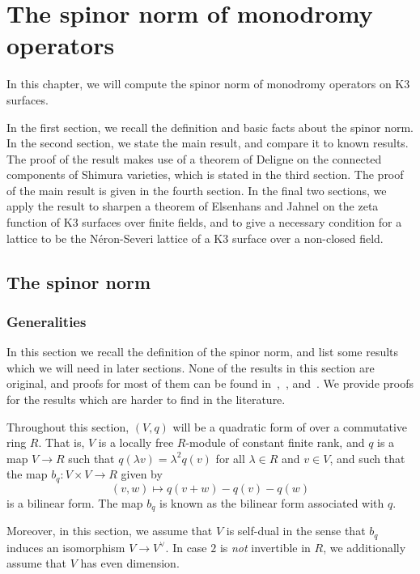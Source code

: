 \chapter{The spinor norm of monodromy operators}\label{ch:spinor_norm}
In this chapter, we will compute the spinor norm of monodromy operators on K3 surfaces.

In the first section, we recall the definition and basic facts about the spinor norm. In the second section, we state the main result, and compare it to known results. The proof of the result makes use of a theorem of Deligne on the connected components of Shimura varieties, which is stated in the third section. The proof of the main result is given in the fourth section. In the final two sections, we apply the result to sharpen a theorem of Elsenhans and Jahnel on the zeta function of K3 surfaces over finite fields, and to give a necessary condition for a lattice to be the N\'eron-Severi lattice of a K3 surface over a non-closed field.

\section{The spinor norm}\label{sec:spinor_norm}
\subsection{Generalities}
In this section we recall the definition of the spinor norm, and list some results which we will need in later sections. None of the results in this section are original, and proofs for most of them can be found in~\cite[Appendix~C]{ConradReductive},~\cite{Knus}, and~\cite{MirandaMorrison}. We provide proofs for the results which are harder to find in the literature.

Throughout this section, $(V,q)$ will be a quadratic form of over a commutative ring $R$. That is, $V$ is a locally free $R$-module of constant finite rank, and $q$ is a map $V \rightarrow R$ such that $q(\lambda v) = \lambda^2 q(v)$ for all $\lambda \in R$ and $v \in V$, and such that the map $b_q\colon V \times V \rightarrow R$ given by
$$
(v,w) \longmapsto q(v + w) - q(v) - q(w)
$$
is a bilinear form. The map $b_q$ is known as the bilinear form associated with $q$.

Moreover, in this section, we assume that $V$ is self-dual in the sense that $b_q$ induces an isomorphism $V \rightarrow V^{\vee}$. In case $2$ is \emph{not} invertible in $R$, we additionally assume that $V$ has even dimension.

